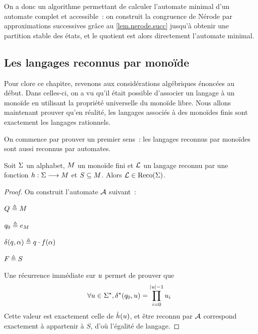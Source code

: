 On a donc un algorithme permettant de calculer l'automate minimal d'un automate
complet et accessible~: on construit la congruence de Nérode par approximations
successives grâce au \cref{lem.nerode.succ} jusqu'à obtenir une partition stable
des états, et le quotient est alors directement l'automate minimal.

\subsection{Les langages reconnus par monoïde}

Pour clore ce chapitre, revenons aux considérations algébriques énoncées au
début. Dans celles-ci, on a vu qu'il était possible d'associer un langage à un
monoïde en utilisant la propriété universelle du monoïde libre. Nous allons
maintenant prouver qu'en réalité, les langages associés à des monoïdes finis
sont exactement les langages rationnels.

On commence par prouver un premier sens~: les langages reconnus par monoïdes
sont aussi reconnus par automates.

\begin{proposition}
  Soit $\Sigma$ un alphabet, $M$ un monoïde fini et $\mathcal L$ un langage
  reconnu par une fonction $h : \displaystyle \Sigma \longrightarrow M$ et
  $S\subseteq M$. Alors $\mathcal L \in \operatorname{Reco}(\Sigma)$.
\end{proposition}

\begin{proof}
  On construit l'automate $\mathcal{A}$ suivant~:
  \begin{itemize}
    \begin{minipage}{0.45\textwidth}
    \item $Q_{} \triangleq M$
    \item $q_{0} \triangleq e_{M}$
    \end{minipage}
    \begin{minipage}{0.45\textwidth}
    \item $\delta_{}(q_{},\alpha) \triangleq q_{}\mathbin{\cdot} f(\alpha)$
    \item $F_{} \triangleq S$
    \end{minipage}
  \end{itemize}

  Une récurrence immédiate sur $u$ permet de prouver que
  \[\forall u\in\Sigma^{\star},\delta_{}^{\star}(q_{0},u)=\prod_{i = 0}^{\left|u\right|-1}u_i\]
  Cette valeur est exactement celle de $\hat{h}(u)$, et être reconnu par
  $\mathcal{A}$ correspond exactement à appartenir à $S$, d'où l'égalité de langage.
\end{proof}

